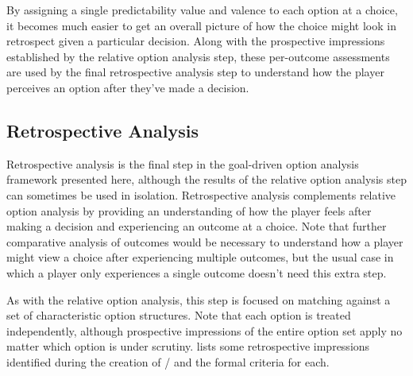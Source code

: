 By assigning a single predictability value and valence to each option at a choice, it becomes much easier to get an overall picture of how the choice might look in retrospect given a particular decision.
%
Along with the prospective impressions established by the relative option analysis step, these per-outcome assessments are used by the final retrospective analysis step to understand how the player perceives an option after they've made a decision.


\subsection{Retrospective Analysis}


Retrospective analysis is the final step in the goal-driven option analysis framework presented here, although the results of the relative option analysis step can sometimes be used in isolation.
%
Retrospective analysis complements relative option analysis by providing an understanding of how the player feels after making a decision and experiencing an outcome at a choice.
%
Note that further comparative analysis of outcomes would be necessary to understand how a player might view a choice after experiencing multiple outcomes, but the usual case in which a player only experiences a single outcome doesn't need this extra step.


As with the relative option analysis, this step is focused on matching against a set of characteristic option structures.
%
Note that each option is treated independently, although prospective impressions of the entire option set apply no matter which option is under scrutiny.
%
 lists some retrospective impressions identified during the creation of \dunyazad/ and the formal criteria for each.


